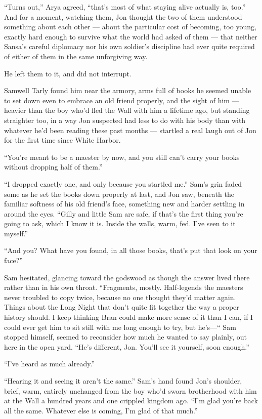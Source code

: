 “Turns out,” Arya agreed, “that’s most of what staying alive actually is, too.” And for a moment, watching them, Jon thought the two of them understood something about each other — about the particular cost of becoming, too young, exactly hard enough to survive what the world had asked of them — that neither Sansa’s careful diplomacy nor his own soldier’s discipline had ever quite required of either of them in the same unforgiving way.

He left them to it, and did not interrupt.

\sceneBreak

Samwell Tarly found him near the armory, arms full of books he seemed unable to set down even to embrace an old friend properly, and the sight of him — heavier than the boy who’d fled the Wall with him a lifetime ago, but standing straighter too, in a way Jon suspected had less to do with his body than with whatever he’d been reading these past months — startled a real laugh out of Jon for the first time since White Harbor.

“You’re meant to be a maester by now, and you still can’t carry your books without dropping half of them.”

“I dropped exactly one, and only because you startled me.” Sam’s grin faded some as he set the books down properly at last, and Jon saw, beneath the familiar softness of his old friend’s face, something new and harder settling in around the eyes. “Gilly and little Sam are safe, if that’s the first thing you’re going to ask, which I know it is. Inside the walls, warm, fed. I’ve seen to it myself.”

“And you? What have you found, in all those books, that’s put that look on your face?”

Sam hesitated, glancing toward the godswood as though the answer lived there rather than in his own throat. “Fragments, mostly. Half-legends the maesters never troubled to copy twice, because no one thought they’d matter again. Things about the Long Night that don’t quite fit together the way a proper history should. I keep thinking Bran could make more sense of it than I can, if I could ever get him to sit still with me long enough to try, but he’s—“ Sam stopped himself, seemed to reconsider how much he wanted to say plainly, out here in the open yard. “He’s different, Jon. You’ll see it yourself, soon enough.”

“I’ve heard as much already.”

“Hearing it and seeing it aren’t the same.” Sam’s hand found Jon’s shoulder, brief, warm, entirely unchanged from the boy who’d sworn brotherhood with him at the Wall a hundred years and one crippled kingdom ago. “I’m glad you’re back all the same. Whatever else is coming, I’m glad of that much.”

